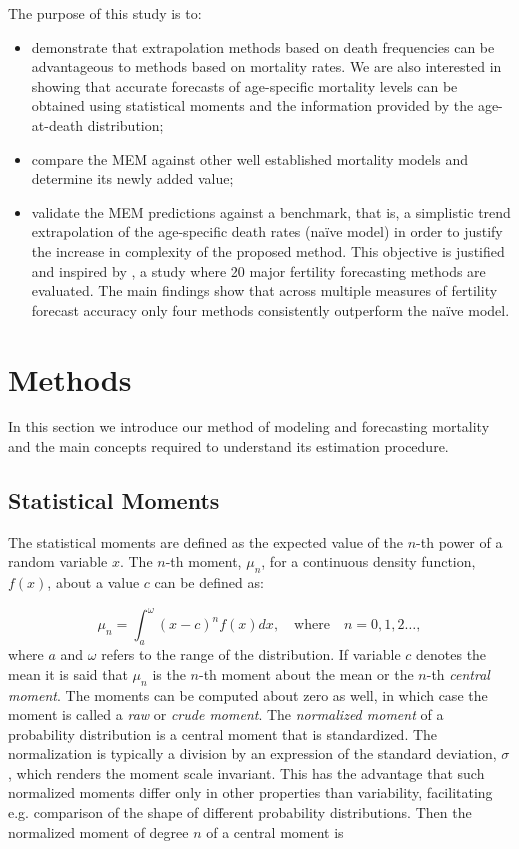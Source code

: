 \documentclass[T0_MEM]{subfiles}
\begin{document}
The purpose of this study is to:
\begin{itemize}
  \item demonstrate that extrapolation methods based on death frequencies can be advantageous to methods based on mortality rates. We are also interested in showing that accurate forecasts of age-specific mortality levels can be obtained using statistical moments and the information provided by the age-at-death distribution;
  \item compare the MEM against other well established mortality models and determine its newly added value;
  \item validate the MEM predictions against a benchmark, that is, a simplistic trend extrapolation of the age-specific death rates (na\"ive model) in order to justify the increase in complexity of the proposed method. This objective is justified and inspired by \cite{bohk2018}, a study where 20 major fertility forecasting methods are evaluated. The main findings show that across multiple measures of fertility forecast accuracy only four methods consistently outperform the na\"ive model.
\end{itemize}


\section{Methods}\label{sec:methods}

In this section we introduce our method of modeling and forecasting mortality and the
main concepts required to understand its estimation procedure.

\subsection{Statistical Moments}\label{sec:Moments}

The statistical moments are defined as the expected value of the $n$-th power of a random variable $x$. The $n$-th moment, $\mu_n$, for a continuous density function, $f(x)$, about a value $c$ can be defined as:

\begin{equation}\label{eq:moments}
\mu_n = \int_{a}^{\omega} (x - c)^n f(x) dx, \quad \textrm{where} \quad n = 0, 1, 2 \dots,
\end{equation}
where $a$ and $\omega$ refers to the range of the distribution. If variable $c$ denotes the mean it is said that $\mu_n$ is the $n$-th moment about the mean or the $n$-th \emph{central moment}. The moments can be computed about zero as well, in which case the moment is called a \emph{raw} or \emph{crude moment}. The \emph{normalized moment} of a probability distribution is a central moment that is standardized. The normalization is typically a division by an expression of the standard deviation, $\sigma$, which renders the moment scale invariant. This has the advantage that such normalized moments differ only in other properties than variability, facilitating e.g. comparison of the shape of different probability distributions. Then the normalized moment of degree $n$ of a central moment is
\end{document}
